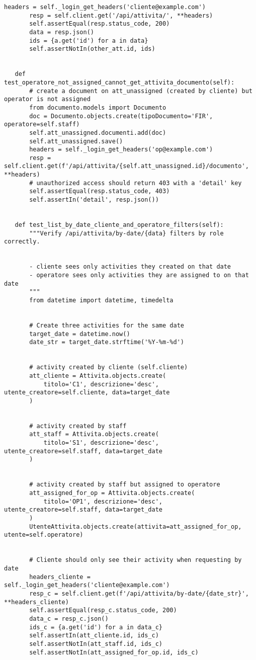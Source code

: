 \documentclass[a4paper]{report}
\begin{document}
\begin{scriptsize}
\begin{lstlisting}[caption={Attivita}, label=lst:javacode]
       headers = self._login_get_headers('cliente@example.com')
       resp = self.client.get('/api/attivita/', **headers)
       self.assertEqual(resp.status_code, 200)
       data = resp.json()
       ids = {a.get('id') for a in data}
       self.assertNotIn(other_att.id, ids)


   def test_operatore_not_assigned_cannot_get_attivita_documento(self):
       # create a document on att_unassigned (created by cliente) but operator is not assigned
       from documento.models import Documento
       doc = Documento.objects.create(tipoDocumento='FIR', operatore=self.staff)
       self.att_unassigned.documenti.add(doc)
       self.att_unassigned.save()
       headers = self._login_get_headers('op@example.com')
       resp = self.client.get(f'/api/attivita/{self.att_unassigned.id}/documento', **headers)
       # unauthorized access should return 403 with a 'detail' key
       self.assertEqual(resp.status_code, 403)
       self.assertIn('detail', resp.json())


   def test_list_by_date_cliente_and_operatore_filters(self):
       """Verify /api/attivita/by-date/{data} filters by role correctly.


       - cliente sees only activities they created on that date
       - operatore sees only activities they are assigned to on that date
       """
       from datetime import datetime, timedelta


       # Create three activities for the same date
       target_date = datetime.now()
       date_str = target_date.strftime('%Y-%m-%d')


       # activity created by cliente (self.cliente)
       att_cliente = Attivita.objects.create(
           titolo='C1', descrizione='desc', utente_creatore=self.cliente, data=target_date
       )


       # activity created by staff
       att_staff = Attivita.objects.create(
           titolo='S1', descrizione='desc', utente_creatore=self.staff, data=target_date
       )


       # activity created by staff but assigned to operatore
       att_assigned_for_op = Attivita.objects.create(
           titolo='OP1', descrizione='desc', utente_creatore=self.staff, data=target_date
       )
       UtenteAttivita.objects.create(attivita=att_assigned_for_op, utente=self.operatore)


       # Cliente should only see their activity when requesting by date
       headers_cliente = self._login_get_headers('cliente@example.com')
       resp_c = self.client.get(f'/api/attivita/by-date/{date_str}', **headers_cliente)
       self.assertEqual(resp_c.status_code, 200)
       data_c = resp_c.json()
       ids_c = {a.get('id') for a in data_c}
       self.assertIn(att_cliente.id, ids_c)
       self.assertNotIn(att_staff.id, ids_c)
       self.assertNotIn(att_assigned_for_op.id, ids_c)



\end{lstlisting}
\end{scriptsize}
\end{document}
